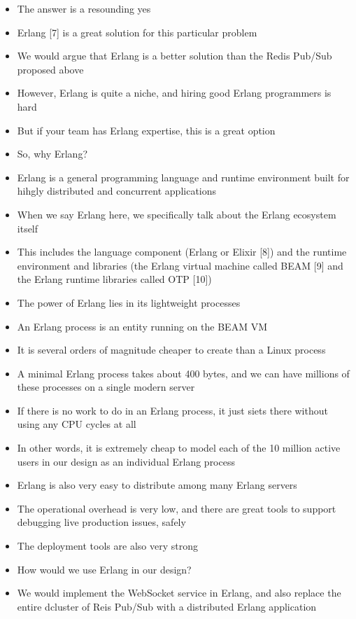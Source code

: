 \documentclass{report}
\theoremstyle{definition}
\begin{document}
\begin{itemize}
\item
The answer is a resounding yes
\item
Erlang [7] is a great solution for this particular problem
\item
We would argue that Erlang is a better solution than the Redis Pub/Sub proposed above
\item
However, Erlang is quite a niche, and hiring good Erlang programmers is hard
\item
But if your team has Erlang expertise, this is a great option
\item
So, why Erlang?
\item
Erlang is a general programming language and runtime environment built for hihgly distributed and concurrent applications
\item
When we say Erlang here, we specifically talk about the Erlang ecosystem itself
\item
This includes the language component (Erlang or Elixir [8]) and the runtime environment and libraries (the Erlang virtual machine called BEAM [9] and the Erlang runtime libraries called OTP [10])
\item
The power of Erlang lies in its lightweight processes
\item
An Erlang process is an entity running on the BEAM VM
\item
It is several orders of magnitude cheaper to create than a Linux process
\item
A minimal Erlang process takes about 400 bytes, and we can have millions of these processes on a single modern server
\item
If there is no work to do in an Erlang process, it just siets there without using any CPU cycles at all
\item
In other words, it is extremely cheap to model each of the 10 million active users in our design as an individual Erlang process
\item
Erlang is also very easy to distribute among many Erlang servers
\item
The operational overhead is very low, and there are great tools to support debugging live production issues, safely
\item
The deployment tools are also very strong
\item
How would we use Erlang in our design?
\item
We would implement the WebSocket service in Erlang, and also replace the entire dcluster of Reis Pub/Sub with a distributed Erlang application

\end{itemize}
\end{document}
